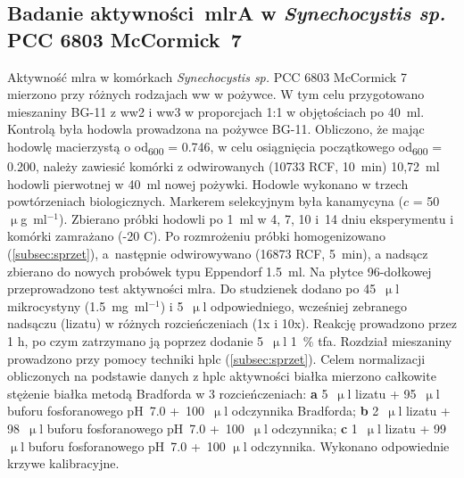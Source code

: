 \subsection{Badanie aktywności~mlrA w \textit{Synechocystis sp.} PCC 6803 McCormick~7}\label{subsec:mlra}
Aktywność \acrshort{mlra} w komórkach
\textit{Synechocystis sp.} PCC 6803 McCormick 7 mierzono przy
różnych rodzajach \acrshort{ww} w pożywce.
W tym celu przygotowano mieszaniny BG-11 z \acrshort{ww}2 i \acrshort{ww}3
w proporcjach 1:1 w objętościach po 40~ml.
Kontrolą była hodowla prowadzona na pożywce BG-11.
Obliczono, że mając hodowlę macierzystą
o \acrshort{od}\textsubscript{600} = 0.746, w celu osiągnięcia
początkowego \acrshort{od}\textsubscript{600} = 0.200, należy zawiesić
komórki z odwirowanych (10733 RCF, 10~min) 10,72~ml hodowli
pierwotnej w 40~ml nowej pożywki.
Hodowle wykonano w trzech powtórzeniach biologicznych.
Markerem selekcyjnym była kanamycyna ($c$ = 50~$\upmu$g~ml$^{-1}$).
Zbierano próbki hodowli po 1~ml w 4, 7, 10 i~14 dniu eksperymentu
i komórki zamrażano (-20 \degree C).
Po rozmrożeniu próbki homogenizowano (\ref{subsec:sprzet}),
a~następnie odwirowywano (16873 RCF, 5~min), a nadsącz
zbierano do nowych probówek typu Eppendorf 1.5~ml.
Na płytce 96-dołkowej przeprowadzono test aktywności \acrshort{mlra}\@.
Do studzienek dodano po 45~$\upmu$l mikrocystyny (1.5~mg~ml$^{-1}$)
i 5~$\upmu$l odpowiedniego, wcześniej zebranego nadsączu (lizatu)
w różnych rozcieńczeniach (1x i 10x).
Reakcję prowadzono przez 1 h, po czym zatrzymano ją
poprzez dodanie 5~$\upmu$l 1~\% \acrshort{tfa}\@.
Rozdział mieszaniny prowadzono przy pomocy techniki \acrshort{hplc} (\ref{subsec:sprzet}).
Celem normalizacji obliczonych na podstawie danych z \acrshort{hplc} aktywności białka
mierzono całkowite stężenie białka metodą Bradforda w 3 rozcieńczeniach:
\textbf{a} 5~$\upmu$l lizatu + 95~$\upmu$l buforu fosforanowego pH~7.0
+~100~$\upmu$l odczynnika Bradforda; \textbf{b} 2~$\upmu$l lizatu
+ 98~$\upmu$l buforu fosforanowego pH~7.0 +~100~$\upmu$l odczynnika;
\textbf{c} 1~$\upmu$l lizatu + 99~$\upmu$l buforu fosforanowego pH~7.0 +~100
$\upmu$l odczynnika.
Wykonano odpowiednie krzywe kalibracyjne.